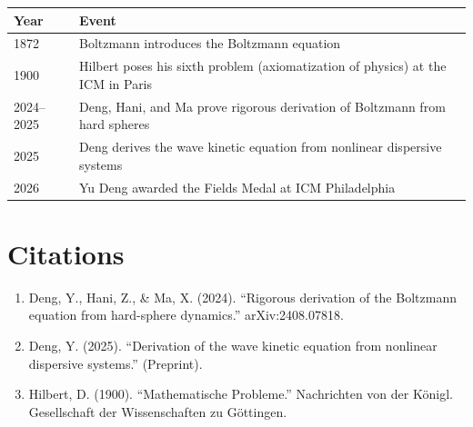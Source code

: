 \begin{tabularx}{\linewidth}{lX}
\toprule
\textbf{Year} & \textbf{Event} \\ \midrule
1872 & Boltzmann introduces the Boltzmann equation \\
1900 & Hilbert poses his sixth problem (axiomatization of physics) at the ICM in Paris \\
2024--2025 & Deng, Hani, and Ma prove rigorous derivation of Boltzmann from hard spheres \\
2025 & Deng derives the wave kinetic equation from nonlinear dispersive systems \\
2026 & Yu Deng awarded the Fields Medal at ICM Philadelphia \\
\bottomrule
\end{tabularx}

\section{Citations}

\begin{enumerate}
\item Deng, Y., Hani, Z., \& Ma, X. (2024). ``Rigorous derivation of the Boltzmann equation from hard-sphere dynamics.'' arXiv:2408.07818.
\item Deng, Y. (2025). ``Derivation of the wave kinetic equation from nonlinear dispersive systems.'' (Preprint).
\item Hilbert, D. (1900). ``Mathematische Probleme.'' Nachrichten von der K\"onigl. Gesellschaft der Wissenschaften zu G\"ottingen.
\end{enumerate}
